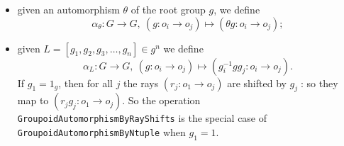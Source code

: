\documentclass[a4paper,11pt]{report}
\begin{document}
{{{\begin{itemize}
\item  given an automorphism $\theta$ of the root group $g$, we define 
\[ \alpha_{\theta} : G \to G,~ (g : o_i \to o_j) \mapsto (\theta g : o_i \to
o_j); \]
 
\item  given $L = [g_1,g_2,g_3,\ldots,g_n] \in g^n$ we define 
\[ \alpha_L : G \to G,~ (g : o_i \to o_j) \mapsto (g_i^{-1}gg_j : o_i \to o_j). \]
 If $g_1 = 1_g$, then for all $j$ the rays $(r_j : o_1 \to o_j)$ are shifted by $g_j\;$: so they map to $(r_jg_j : o_1 \to o_j)$. So the operation \texttt{GroupoidAutomorphismByRayShifts} is the special case of \texttt{GroupoidAutomorphismByNtuple} when $g_1=1$. 
\end{itemize}
 

 }

 
\begin{Verbatim}[commandchars=!@|,fontsize=\small,frame=single,label=Example]
  

\end{Verbatim}}}
\end{document}
